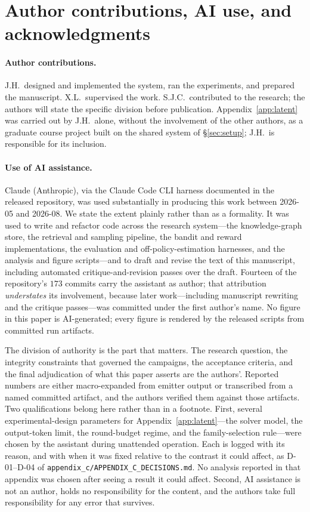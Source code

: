 \documentclass[10pt,twocolumn]{article}
\begin{document}
\section*{Author contributions, AI use, and acknowledgments}

\paragraph{Author contributions.} J.H.\ designed and implemented the system, ran the
experiments, and prepared the manuscript. X.L.\ supervised the work. S.J.C.\ contributed
to the research; the authors will state the specific division before publication.
Appendix~\ref{app:latent} was carried out by J.H.\ alone, without the involvement of the
other authors, as a graduate course project built on the shared system of
\S\ref{sec:setup}; J.H.\ is responsible for its inclusion.

\paragraph{Use of AI assistance.} Claude (Anthropic), via the Claude Code CLI harness
documented in the released repository, was used substantially in producing this work
between 2026-05 and 2026-08. We state the extent plainly rather than as a formality. It
was used to write and refactor code across the research system---the knowledge-graph
store, the retrieval and sampling pipeline, the bandit and reward implementations, the
evaluation and off-policy-estimation harnesses, and the analysis and figure
scripts---and to draft and revise the text of this manuscript, including automated
critique-and-revision passes over the draft. Fourteen of the repository's $173$ commits
carry the assistant as author; that attribution \emph{understates} its involvement,
because later work---including manuscript rewriting and the critique passes---was
committed under the first author's name. No figure in this paper is AI-generated; every
figure is rendered by the released scripts from committed run artifacts.

The division of authority is the part that matters. The research question, the integrity
constraints that governed the campaigns, the acceptance criteria, and the final
adjudication of what this paper asserts are the authors'. Reported numbers are either macro-expanded from
emitter output or transcribed from a named committed artifact, and the authors verified
them against those artifacts. Two qualifications belong here rather than in a
footnote. First, several experimental-design parameters for Appendix~\ref{app:latent}---the
solver model, the output-token limit, the round-budget regime, and the family-selection
rule---were chosen by the assistant during unattended operation. Each is logged with its
reason, and with when it was fixed relative to the contrast it could affect, as
D-01--D-04 of \texttt{appendix\_c/APPENDIX\_C\_DECISIONS.md}. No analysis reported in that
appendix was chosen after seeing a result it could affect. Second, AI assistance is not an author, holds no
responsibility for the content, and the authors take full responsibility for any error
that survives.
\end{document}
